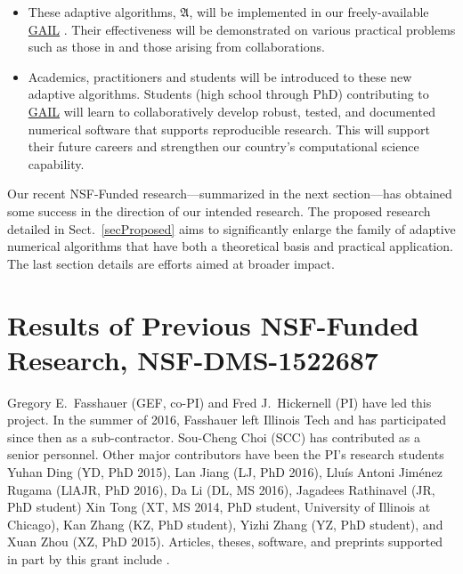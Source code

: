 \documentclass[11pt]{NSFamsart}
\newcommand{\GAIL}{\hyperlink{GAILlink}{GAIL}\xspace}
\newcommand{\fA}{\mathfrak{A}}
\begin{document}
\begin{itemize}
	\item These adaptive algorithms, $\fA$, will be implemented in our freely-available \GAIL 
	\cite{ChoEtal17b}.  Their 
	effectiveness will be demonstrated on various practical problems such as those in \cite{VirLib17a} 
	and those arising from collaborations.
	
	\item Academics, practitioners and students will be introduced to these 
	new adaptive algorithms.  Students (high school through PhD) contributing to \GAIL will learn to 
	collaboratively develop robust, tested, 
	and documented numerical software that supports reproducible research.  This will support their 
	future careers and strengthen our country's computational science capability.
	
\end{itemize}



Our recent NSF-Funded research---summarized in the next section---has obtained some success in 
the direction of our intended research.  The proposed research detailed 
in Sect.\ \ref{secProposed} aims to significantly enlarge the family of adaptive numerical 
algorithms that have both a theoretical basis and practical application.  The last section details are 
efforts aimed at broader impact.

\section{Results of Previous NSF-Funded Research,
NSF-DMS-1522687} \label{SectPrevious}

Gregory E.\ Fasshauer (GEF, co-PI) and Fred J.\ Hickernell (PI) have led this project.  In the summer 
of 
2016, Fasshauer left Illinois Tech and has participated since then as a sub-contractor.  
Sou-Cheng Choi (SCC) has contributed as a senior personnel.  Other major contributors 
have been the PI's research students Yuhan Ding (YD, PhD 2015), Lan Jiang (LJ, PhD 2016), 
Llu\'is Antoni Jim\'enez Rugama (LlAJR, PhD 2016), Da Li (DL, MS 2016), Jagadees Rathinavel (JR, 
PhD student)
Xin Tong (XT, MS 2014, PhD student, University of Illinois at Chicago), Kan Zhang (KZ, PhD 
student), Yizhi Zhang (YZ, PhD student), and Xuan Zhou (XZ, PhD 2015).  Articles, theses,  
software, and preprints supported in 
part by this 
grant 
include 
\cite{ala_augmented_2017, 
	ChoEtal17a,
	ChoEtal17b,
	Din15a, 
	GilEtal16a,
	Hic17a,
	HicJim16a,
	HicEtal18a,
	HicEtal17a,
	GilJim16b,
	JimHic16a,
	JohFasHic18a,
	Li16a,
	Liu17a,
	MarEtal18a,
	mccourt_stable_2017,
	MCCEtal19a,
	mishra_hybrid_2018,
	MisEtal19a,
	rashidinia_stable_2016,
	rashidinia_stable_2018,
	Zha17a,
	Zho15a,
	ZhoHic15a}.
\end{document}
